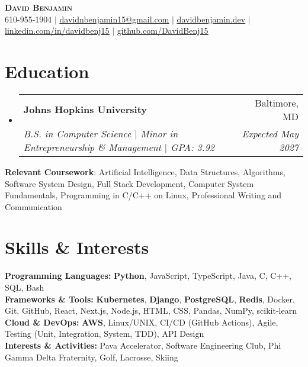 \documentclass[letterpaper,10pt]{article}
\makeatletter
\newcommand{\resumeItem}[1]{
  \item\small{
    {#1 \vspace{-2pt}}
  }
}
\newcommand{\resumeSubheading}[4]{
  \vspace{-2pt}\item
    \begin{tabular*}{0.97\textwidth}[t]{l@{\extracolsep{\fill}}r}
      \textbf{#1} & #2 \\
      \textit{\small#3} & \textit{\small #4} \\
    \end{tabular*}\vspace{-7pt}
}
\newcommand{\resumeSubHeadingListStart}{\begin{itemize}[leftmargin=0.15in, label={}]}
\newcommand{\resumeSubHeadingListEnd}{\end{itemize}}
\newcommand{\resumeItemListStart}{\begin{itemize}}
\newcommand{\resumeItemListEnd}{\end{itemize}\vspace{-5pt}}
\makeatother
\begin{document}
\begin{center}
    \textbf{\Huge \scshape David Benjamin} \\ \vspace{1pt}
    \small 610-955-1904 $|$ \href{mailto:davidnbenjamin15@gmail.com}{\underline{davidnbenjamin15@gmail.com}} $|$ 
    \href{https://davidbenjamin.dev}{\underline{davidbenjamin.dev}} $|$
    \href{https://www.linkedin.com/in/davidbenj15/}{\underline{linkedin.com/in/davidbenj15}} $|$
    \href{https://github.com/DavidBenj15}{\underline{github.com/DavidBenj15}}
\end{center}

\section{Education}
  \resumeSubHeadingListStart
    \resumeSubheading
      {Johns Hopkins University}{Baltimore, MD}
      {B.S. in Computer Science $|$ Minor in Entrepreneurship \& Management $|$ GPA: 3.92}{Expected May 2027}
  \resumeSubHeadingListEnd


    \begin{itemize}[leftmargin=0.15in, label={}]
    \small{
        \item{
            \textbf{Relevant Coursework}: Artificial Intelligence, Data Structures, Algorithms, Software System Design, Full Stack Development, Computer System Fundamentals, Programming in C/C++ on Linux, Professional Writing and Communication
        }
    }
\end{itemize}

\section{Skills \& Interests}
\begin{itemize}[leftmargin=0.15in, label={}]
    \small{
        \item{
            \textbf{Programming Languages:} \textbf{Python}, JavaScript, TypeScript, Java, C, C++, SQL, Bash \\
            \textbf{Frameworks \& Tools:} \textbf{Kubernetes}, \textbf{Django}, \textbf{PostgreSQL}, \textbf{Redis}, Docker, Git, GitHub, React, Next.js, Node.js, HTML, CSS, Pandas, NumPy, scikit-learn \\
            \textbf{Cloud \& DevOps:} \textbf{AWS}, Linux/UNIX, CI/CD (GitHub Actions), Agile, Testing (Unit, Integration, System, TDD), API Design \\
            \textbf{Interests \& Activities:} Pava Accelerator, Software Engineering Club, Phi Gamma Delta Fraternity, Golf, Lacrosse, Skiing
        }
    }
\end{itemize}
\end{document}
